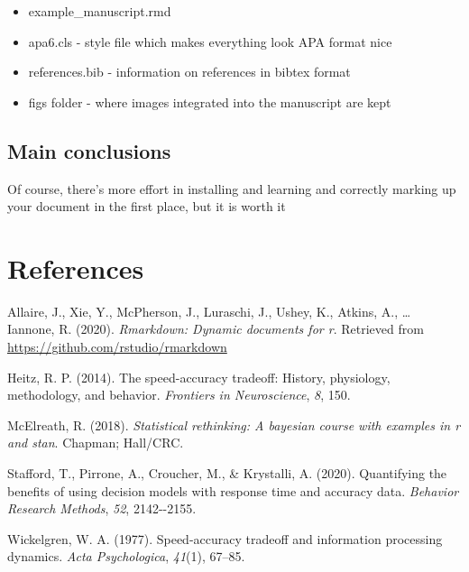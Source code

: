 \documentclass[
  english,
  ,jou,floatsintext]{apa6}
\providecommand{\tightlist}{%
  \setlength{\itemsep}{0pt}\setlength{\parskip}{0pt}}
\newlength{\cslhangindent}
\newlength{\cslentryspacingunit} %
\newenvironment{CSLReferences}[2] %
 {%
  \setlength{\parindent}{0pt}
  \ifodd #1
  \let\oldpar\par
  \def\par{\hangindent=\cslhangindent\oldpar}
  \fi
  \setlength{\parskip}{#2\cslentryspacingunit}
 }%
 {}
\begin{document}
\begin{itemize}
\tightlist
\item
  example\_manuscript.rmd
\item
  apa6.cls - style file which makes everything look APA format nice
\item
  references.bib - information on references in bibtex format
\item
  figs folder - where images integrated into the manuscript are kept
\end{itemize}

\hypertarget{main-conclusions}{%
\subsection{Main conclusions}\label{main-conclusions}}

Of course, there's more effort in installing and learning and correctly marking up your document in the first place, but it is worth it

\hypertarget{references}{%
\section*{References}\label{references}}

\hypertarget{refs}{}
\begin{CSLReferences}{1}{0}
\leavevmode{}%
Allaire, J., Xie, Y., McPherson, J., Luraschi, J., Ushey, K., Atkins, A., \ldots{} Iannone, R. (2020). \emph{Rmarkdown: Dynamic documents for r}. Retrieved from \url{https://github.com/rstudio/rmarkdown}

\leavevmode{}%
Heitz, R. P. (2014). The speed-accuracy tradeoff: History, physiology, methodology, and behavior. \emph{Frontiers in Neuroscience}, \emph{8}, 150.

\leavevmode{}%
McElreath, R. (2018). \emph{Statistical rethinking: A bayesian course with examples in r and stan}. Chapman; Hall/CRC.

\leavevmode{}%
Stafford, T., Pirrone, A., Croucher, M., \& Krystalli, A. (2020). Quantifying the benefits of using decision models with response time and accuracy data. \emph{Behavior Research Methods}, \emph{52}, 2142-\/-2155.

\leavevmode{}%
Wickelgren, W. A. (1977). Speed-accuracy tradeoff and information processing dynamics. \emph{Acta Psychologica}, \emph{41}(1), 67--85.

\end{CSLReferences}
\end{document}
